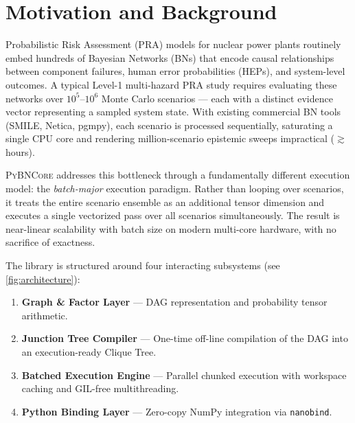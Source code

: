 \documentclass[11pt, letterpaper]{article}
\newcommand{\bncore}{\textsc{PyBNCore}}
\newcommand{\smiletool}{\textsc{SMILE}}
\theoremstyle{definitionstyle}
\begin{document}
\tableofcontents
\newpage

\section{Motivation and Background}
\label{sec:motivation}

Probabilistic Risk Assessment (PRA) models for nuclear power plants
routinely embed hundreds of Bayesian Networks (BNs) that encode causal
relationships between component failures, human error probabilities
(HEPs), and system-level outcomes. A typical Level-1 multi-hazard PRA
study requires evaluating these networks over $10^5$--$10^6$ Monte Carlo
scenarios — each with a distinct evidence vector representing a sampled
system state. With existing commercial BN tools (\smiletool{}, Netica,
pgmpy), each scenario is processed sequentially, saturating a single CPU
core and rendering million-scenario epistemic sweeps impractical
($\gtrsim$hours).

\bncore{} addresses this bottleneck through a fundamentally different
execution model: the \emph{batch-major} execution paradigm. Rather than
looping over scenarios, it treats the entire scenario ensemble as an
additional tensor dimension and executes a single vectorized pass over
all scenarios simultaneously. The result is near-linear scalability with
batch size on modern multi-core hardware, with no sacrifice of exactness.

The library is structured around four interacting subsystems (see
\cref{fig:architecture}):
\begin{enumerate}[topsep=2pt, itemsep=2pt]
  \item \textbf{Graph \& Factor Layer} — DAG representation and
        probability tensor arithmetic.
  \item \textbf{Junction Tree Compiler} — One-time off-line compilation
        of the DAG into an execution-ready Clique Tree.
  \item \textbf{Batched Execution Engine} — Parallel chunked execution
        with workspace caching and GIL-free multithreading.
  \item \textbf{Python Binding Layer} — Zero-copy NumPy integration via
        \texttt{nanobind}.
\end{enumerate}
\end{document}
